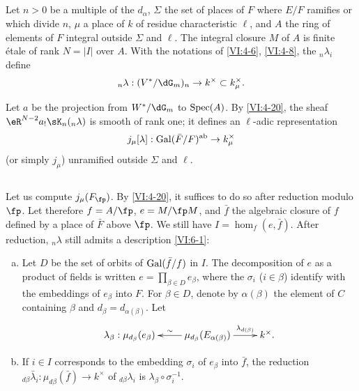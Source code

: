 \subsection{}\label{VI:6-2}

Let $n>0$ be a multiple of the $d_\alpha$, $\Sigma$ the set of places of $F$
where $E/F$ ramifies or which divide $n$, $\mu$ a place of $k$ of
residue characteristic $\ell$, and $A$ the ring of elements of $F$
integral outside $\Sigma$ and $\ell$. The integral closure $M$ of $A$
is finite étale of rank $N=|I|$ over $A$. With the notations of \ref{VI:4-6},
\ref{VI:4-8}, the $_n \lambda_i$ define 
\[
  _n\lambda:(V^\ast/\dG_m)_n \to k^\times \subset k_\mu^\times \text{.} 
\]

Let $a$ be the projection from $W^\ast/\dG_m$ to $\operatorname{Spec}(A)$. By
\ref{VI:4-20}, the sheaf $\eR^{N-2} a_! \sK_n(_n \lambda)$ is smooth of rank
one; it defines an $\ell$-adic representation
\[
  j_\mu[\lambda]:\operatorname{Gal}(\bar F/F)^\text{ab} \to k_\mu^\times
\]
(or simply $j_\mu$) unramified outside $\Sigma$ and $\ell$. 





\subsection{}\label{VI:6-3}

Let us compute $j_\mu(F_\fp)$. By \ref{VI:4-20}, it suffices to do so
after reduction modulo $\fp$. Let therefore $f=A/\fp$, $e=M/\fp M$, and
$\bar f$ the algebraic closure of $f$ defined by a place of $\bar F$
above $\fp$. We still have $I=\hom_f(e,\bar f)$. After reduction,
$_n\lambda$ still admits a description \ref{VI:6-1}:
\begin{enumerate}[a)]
  \item Let $D$ be the set of orbits of $\operatorname{Gal}(\bar f/f)$ in $I$. The
    decomposition of $e$ as a product of fields is written
    $e=\prod_{\beta\in D} e_\beta$, where the $\sigma_i$ ($i\in \beta$)
    identify with the embeddings of $e_\beta$ into $F$. For $\beta\in D$, denote
    by $\alpha(\beta)$ the element of $C$ containing $\beta$ and
    $d_\beta=d_{\alpha(\beta)}$. Let 
    \[\xymatrix{
      \lambda_\beta : \mu_{d_\beta}(e_\beta) 
        & \ar[l]_-\sim \mu_{d_\beta}(E_{\alpha(\beta)}) \ar[r]^-{\lambda_{d(\beta)}} 
        & k^\times \text{.} 
    }\]
  \item If $i\in I$ corresponds to the embedding $\sigma_i$ of $e_\beta$ into
    $\bar f$, the reduction
    $_{d\beta} \bar\lambda_i:\mu_{d\beta}(\bar f) \to k^\times$ of
    $_{d\beta} \lambda_i$ is
    $\lambda_\beta \circ \sigma_i^{-1}$.
\end{enumerate}

